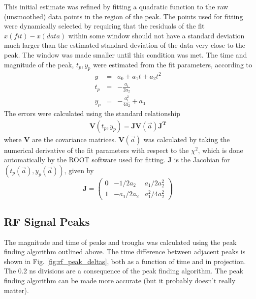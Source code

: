 \documentclass{paper}
\begin{document}
This initial estimate was refined by fitting a quadratic function to the
raw (unsmoothed) data points in the region of the peak. The points used for 
fitting were dynamically selected by requiring that the residuals of the fit
$x(fit)-x(data)$ within some window should not have a standard deviation much 
larger than the estimated standard deviation of the data very close to the peak. 
The window was made smaller until this condition was met. The time and magnitude
of the peak, $t_p, y_p$ were estimated from the fit parameters, according to
\begin{eqnarray}
y &=& a_0 + a_1 t + a_2 t^2 \\
t_p &=& -\frac{a_1}{2a_2}  \\
y_p &=& -\frac{a_1^2}{4a_2}+a_0
\end{eqnarray}
The errors were calculated using the standard relationship
\begin{eqnarray}
\mathbf{V}(t_p, y_p) = \mathbf{J} \mathbf{V}(\vec{a}) \mathbf{J^T}
\end{eqnarray}
where $\mathbf{V}$ are the covariance matrices. $\mathbf{V}(\vec{a})$ was 
calculated by taking the numerical derivative of the fit parameters with respect 
to the $\chi^2$, which is done  automatically by the ROOT software used for 
fitting. $\mathbf{J}$ is the Jacobian for $(t_p(\vec{a}), y_p(\vec{a}))$, given
by
\begin{equation}
\mathbf{J} = \left(\begin{array}{ccc}
    0 & -1/2a_2 & a_1/2a_2^2 \\
    1 & -a_1/2a_2 & a_1^2/4a_2^2
\end{array}\right)
\end{equation}

\subsection{RF Signal Peaks}
The magnitude and time of peaks and troughs was calculated using the peak 
finding algorithm outlined above. The time difference between adjacent peaks is
shown in Fig. \ref{fig:rf_peak_deltas}, both as a function of time and in
projection. The 0.2 ns divisions are a consequence of the peak finding 
algorithm. The peak finding algorithm can be made more accurate 
(but it probably doesn't really matter).
\end{document}

